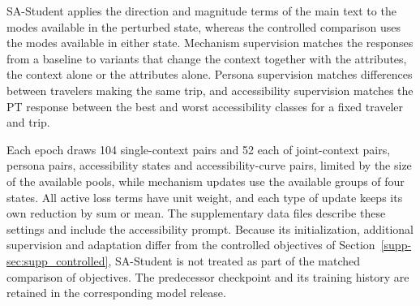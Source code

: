 SA-Student applies the direction and magnitude terms of the main text to the modes available in the perturbed state, whereas the controlled comparison uses the modes available in either state. Mechanism supervision matches the responses from a baseline to variants that change the context together with the attributes, the context alone or the attributes alone. Persona supervision matches differences between travelers making the same trip, and accessibility supervision matches the PT response between the best and worst accessibility classes for a fixed traveler and trip.

Each epoch draws 104 single-context pairs and 52 each of joint-context pairs, persona pairs, accessibility states and accessibility-curve pairs, limited by the size of the available pools, while mechanism updates use the available groups of four states. All active loss terms have unit weight, and each type of update keeps its own reduction by sum or mean. The supplementary data files describe these settings and include the accessibility prompt. Because its initialization, additional supervision and adaptation differ from the controlled objectives of Section~\ref{supp-sec:supp_controlled}, SA-Student is not treated as part of the matched comparison of objectives. The predecessor checkpoint and its training history are retained in the corresponding model release.
\FloatBarrier
